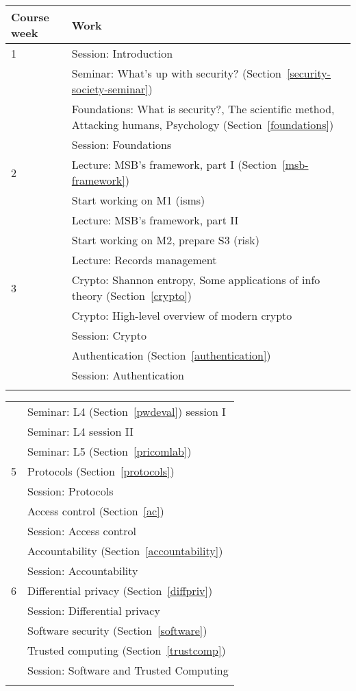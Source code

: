 	\centering
  \begin{tabular}{lp{9cm}}
    \toprule
    \textbf{Course week}	& \textbf{Work} \\
    \midrule
    1
      & Session: Introduction\\
      & Seminar: What's up with security? (Section~\ref{security-society-seminar})\\
      & Foundations: What is security?, The scientific method, Attacking 
      humans, Psychology (Section~\ref{foundations})\\
      & Session: Foundations\\
    \midrule
    2
      & Lecture: MSB's framework, part I (Section~\ref{msb-framework})\\
      & Start working on M1 (isms)\\
      & Lecture: MSB's framework, part II\\
      & Start working on M2, prepare S3 (risk)\\
      & Lecture: Records management\\
    \midrule
    3
      & Crypto: Shannon entropy, Some applications of info theory 
      (Section~\ref{crypto})\\
      & Crypto: High-level overview of modern crypto\\
      & Session: Crypto\\
      & Authentication (Section~\ref{authentication})\\
      & Session: Authentication\\
    \midrule
\mode<presentation>{%
  \end{tabular}
  \begin{tabular}{lp{9cm}}
}%
    4
      & Seminar: L4 (Section~\ref{pwdeval}) session I\\
      & Seminar: L4 session II\\
      & Seminar: L5 (Section~\ref{pricomlab})\\
    \midrule
    5
      & Protocols (Section~\ref{protocols})\\
      & Session: Protocols\\
      & Access control (Section~\ref{ac})\\
      & Session: Access control\\
      & Accountability (Section~\ref{accountability})\\
      & Session: Accountability\\
    \midrule
    6
      & Differential privacy (Section~\ref{diffpriv})\\
      & Session: Differential privacy\\
      & Software security (Section~\ref{software})\\
      & Trusted computing (Section~\ref{trustcomp})\\
      & Session: Software and Trusted Computing\\
    \midrule
\mode<presentation>{%
  \end{tabular}
